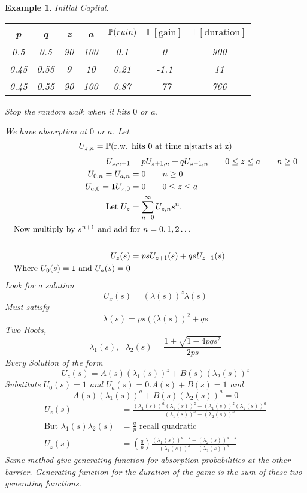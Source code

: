 \documentclass{notes}
\theoremstyle{plain}
\newtheorem*{example}{Example}
\newcommand{\bP}{\mathbb{P}}
\newcommand{\bE}{\mathbb{E}}
\newcommand{\prob}[1]{\bP \negthinspace\left(#1\right)}
\newcommand{\expect}[1]{\bE\!\left[#1\right]}
\begin{document}
\begin{example} Initial Capital.

\begin{center}
\begin{tabular}{|c|c|c|c|c|c|c|}
\hline
p& q &z &a &$\prob{ruin}$ &$\expect{\text{gain}}$ &
$\expect{\text{duration}}$\\ \hline
0.5 & 0.5 &  90 & 100 & 0.1 & 0 & 900 \\ \hline
0.45 & 0.55 & 9 & 10 & 0.21 & -1.1 & 11 \\ \hline
  0.45 & 0.55 & 90 & 100 & 0.87 & -77 & 766  \\ \hline
\end{tabular}
\end{center}

Stop the random walk when it hits $0$ or $a$. 

We have \emph{absorption} at $0$ or $a$.  Let
\[
U_{z,n} = \prob{\text{r.w. hits 0 at time n|starts at z}}
\]
\begin{align*}
U_{z,n+1} &= pU_{z+1,n} + qU_{z-1,n}\qquad 0\le z\le a \qquad n\geq0\\ 
U_{0,n} = U_{a,n} &= 0 \qquad n\geq 0 \\
 U_{a,0} = 1  U_{z,0} &= 0\qquad  0\le z\le a \\
\text{Let } U_z &= \sum_{n=0}^\infty U_{z,n}s^n.\\
\intertext{Now multiply by
  $s^{n+1}$ and add for $n=0,1,2\dots$}\\
 U_z(s)&= psU_{z+1}(s) + qsU_{z-1}(s)\\
\text{Where } U_0(s) = 1 \text{ and } U_a(s) = 0\\
\end{align*}
Look for a solution 
\[
U_x(s) = \left(\lambda(s)\right)^z\lambda(s)
\]
Must satisfy
\[
\lambda(s) = ps\left((\lambda(s)\right)^2 +qs
\]
Two Roots,
\[
\lambda_1(s),\text{ }\lambda_2(s) = \frac{1\pm\sqrt{1-4pqs^2}}{2ps}
\]
Every Solution of the form
\[
U_z(s) =A(s)\left(\lambda_1(s)\right)^z + B(s)\left(\lambda_2(s)\right)^z
\]
Substitute $ U_0(s) = 1 $ and  $ U_a(s) = 0$.$A(s)+B(s)=1$ and
\[
A(s)\left(\lambda_1(s)\right)^a +B(s)\left(\lambda_2(s)\right)^a=0
\]
\begin{align*}
U_z(s) &=  \frac{\left(\lambda_1(s)\right)^a\left(\lambda_2(s)\right)^z -
\left(\lambda_1(s)\right)^z\left(\lambda_2(s)\right)^a}
{\left(\lambda_1(s)\right)^a -\left(\lambda_2(s)\right)^a}\\
\text{But } \lambda_1(s)\lambda_2(s) &=\frac{q}{p} \text{ recall quadratic}\\
U_z(s)
&=\left(\frac{q}{p}\right)\frac{\left(\lambda_1(s)\right)^{a-z}-
\left(\lambda_2(s)\right)^{a-z}}
{\left(\lambda_1(s)\right)^a -\left(\lambda_2(s)\right)^a}
\end{align*}
Same method give generating function for absorption probabilities at
the other barrier. Generating function for the duration of the game is
the sum of these two generating functions.
\end{example}
\end{document}
